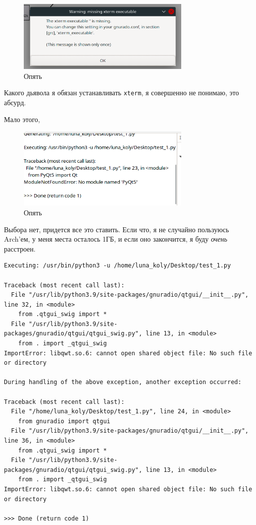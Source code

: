 \documentclass[a4paper,12pt]{report}
\begin{document}
    \begin{figure}[H]
        \centering
        \includegraphics[width=0.75\textwidth]{images/error_3.png}
        \caption{Опять}
        \label{fig:error_3}
    \end{figure}
    
    Какого дьявола я обязан устанавливать \texttt{xterm}, я совершенно не понимаю, это абсурд.
    
    Мало этого,
    
    \begin{figure}[H]
        \centering
        \includegraphics[width=0.75\textwidth]{images/error_4.png}
        \caption{Опять}
        \label{fig:error_4}
    \end{figure}
    
    Выбора нет, придется все это ставить. Если что, я не случайно пользуюсь Arch'ем, у меня места осталось 1ГБ, и если оно закончится, я буду \emph{очень} расстроен.
    
\begin{lstlisting}[caption=Опять какая-то фигня]
Executing: /usr/bin/python3 -u /home/luna_koly/Desktop/test_1.py

Traceback (most recent call last):
  File "/usr/lib/python3.9/site-packages/gnuradio/qtgui/__init__.py", line 32, in <module>
    from .qtgui_swig import *
  File "/usr/lib/python3.9/site-packages/gnuradio/qtgui/qtgui_swig.py", line 13, in <module>
    from . import _qtgui_swig
ImportError: libqwt.so.6: cannot open shared object file: No such file or directory

During handling of the above exception, another exception occurred:

Traceback (most recent call last):
  File "/home/luna_koly/Desktop/test_1.py", line 24, in <module>
    from gnuradio import qtgui
  File "/usr/lib/python3.9/site-packages/gnuradio/qtgui/__init__.py", line 36, in <module>
    from .qtgui_swig import *
  File "/usr/lib/python3.9/site-packages/gnuradio/qtgui/qtgui_swig.py", line 13, in <module>
    from . import _qtgui_swig
ImportError: libqwt.so.6: cannot open shared object file: No such file or directory

>>> Done (return code 1)
\end{lstlisting}
    
\end{document}
